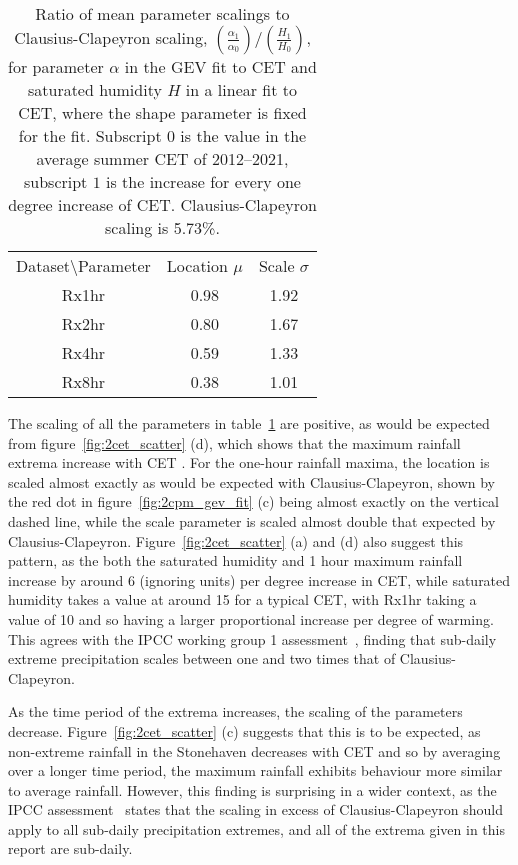 \begin{table}[H]
    \centering
    \begin{tabular}{c c c}
        Dataset\textbackslash Parameter  & Location $\mu$ & Scale $\sigma$ \\
        Rx1hr &0.98&1.92 \\
        Rx2hr &0.80&1.67 \\
        Rx4hr &0.59&1.33 \\
        Rx8hr &0.38&1.01 \\
    \end{tabular}
    \caption[Ratio of mean parameter scalings to Clausius-Clapeyron scaling.]{
        Ratio of mean parameter scalings to Clausius-Clapeyron scaling, $\left( \frac{\alpha_1}{\alpha_0} \right) / \left( \frac{H_1}{H_0} \right)$,
        for parameter $\alpha$ in the GEV fit to CET and saturated humidity $H$ in a linear fit to CET,
        where the shape parameter is fixed for the fit.
        Subscript $0$ is the value in the average summer CET of 2012--2021,
            subscript $1$ is the increase for every one degree increase of CET.
    Clausius-Clapeyron scaling is 5.73\%.}
    \label{tab:CCtable}
\end{table}

The scaling of all the parameters in table~\ref{tab:CCtable} are positive,
    as would be expected from figure~\ref{fig:2cet_scatter} (d),
    which shows that the maximum rainfall extrema increase with CET .
For the one-hour rainfall maxima,
    the location is scaled almost exactly as would be expected with Clausius-Clapeyron,
    shown by the red dot in figure~\ref{fig:2cpm_gev_fit} (c) being almost exactly on the vertical dashed line,
    while the scale parameter is scaled almost double that expected by Clausius-Clapeyron.
Figure~\ref{fig:2cet_scatter} (a) and (d) also suggest this pattern,
    as the both the saturated humidity and 1 hour maximum rainfall increase by around 6 (ignoring units)
    per degree increase in CET, while saturated humidity takes a value at around 15 for a typical CET,
    with Rx1hr taking a value of 10 and so having a larger proportional increase per degree of warming.
This agrees with the IPCC working group 1 assessment~\cite{IPCC_2021},
    finding that sub-daily extreme precipitation scales between one and two times that of Clausius-Clapeyron.

As the time period of the extrema increases,
    the scaling of the parameters decrease.
Figure~\ref{fig:2cet_scatter} (c) suggests that this is to be expected,
    as non-extreme rainfall in the Stonehaven decreases with CET and so by averaging over a longer time period,
    the maximum rainfall exhibits behaviour more similar to average rainfall.
However, this finding is surprising in a wider context,
    as the IPCC assessment~\cite{IPCC_2021} states that the scaling in excess of Clausius-Clapeyron should apply to all sub-daily precipitation extremes,
    and all of the extrema given in this report are sub-daily.

